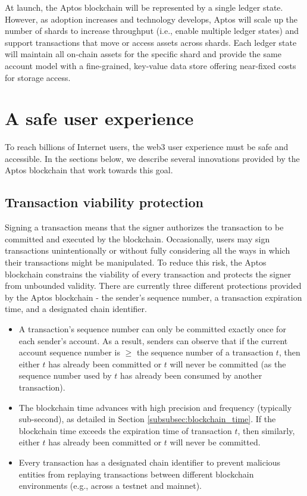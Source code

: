 \documentclass{article}
\begin{document}
At launch, the Aptos blockchain will be represented by a single ledger state. However, as adoption increases and technology develops, Aptos will scale up the number of shards to increase throughput (i.e., enable multiple ledger states) and support transactions that move or access assets across shards. Each ledger state will maintain all on-chain assets for the specific shard and provide the same account model with a fine-grained, key-value data store offering near-fixed costs for storage access. 

\section{A safe user experience}
\label{sec:user}

To reach billions of Internet users, the web3 user experience must be safe and accessible. In the sections below, we describe several innovations provided by the Aptos blockchain that work towards this goal.

\subsection{Transaction viability protection}
\label{subsec:transaction_replay_protection}

Signing a transaction means that the signer authorizes the transaction to be committed and executed by the blockchain. Occasionally, users may sign transactions unintentionally or without fully considering all the ways in which their transactions might be manipulated. To reduce this risk, the Aptos blockchain constrains the viability of every transaction and protects the signer from unbounded validity. There are currently three different protections provided by the Aptos blockchain - the sender's sequence number, a transaction expiration time, and a designated chain identifier.
\begin{itemize}
\item A transaction's sequence number can only be committed exactly once for each sender's account. As a result, senders can observe that if the current account sequence number is $\geq$ the sequence number of a transaction $t$, then either $t$ has already been committed or $t$ will never be committed (as the sequence number used by $t$ has already been consumed by another transaction).
\item The blockchain time advances with high precision and frequency (typically sub-second), as detailed in Section \ref{subsubsec:blockchain_time}. If the blockchain time exceeds the expiration time of transaction $t$, then similarly, either $t$ has already been committed or $t$ will never be committed.
\item Every transaction has a designated chain identifier to prevent malicious entities from replaying transactions between different blockchain environments (e.g., across a testnet and mainnet).
\end{itemize}
\end{document}
